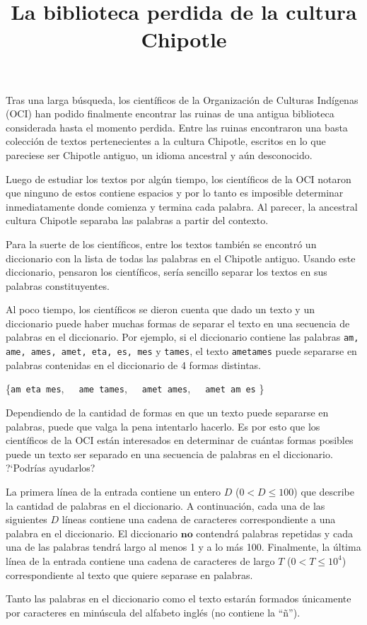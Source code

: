 \documentclass{oci}
\title{La biblioteca perdida de la cultura Chipotle}
\begin{document}
\begin{problemDescription}
Tras una larga búsqueda, los científicos de la Organización de Culturas
Indígenas (OCI) han podido finalmente encontrar las ruinas de una antigua
biblioteca considerada hasta el momento perdida.
Entre las ruinas encontraron una basta colección de textos pertenecientes a la
cultura Chipotle, escritos en lo que pareciese ser Chipotle antiguo, un idioma
ancestral y aún desconocido.

Luego de estudiar los textos por algún tiempo, los científicos de la OCI notaron
que ninguno de estos contiene espacios y por lo tanto es imposible determinar
inmediatamente donde comienza y termina cada palabra.
Al parecer, la ancestral cultura Chipotle separaba las palabras a partir del
contexto.

Para la suerte de los científicos, entre los textos también se encontró un
diccionario con la lista de todas las palabras en el Chipotle antiguo.
Usando este diccionario, pensaron los científicos, sería sencillo separar los
textos en sus palabras constituyentes.

Al poco tiempo, los científicos se dieron cuenta que dado un texto y un
diccionario puede haber muchas formas de separar el texto en una secuencia de
palabras en el diccionario.
Por ejemplo, si el diccionario contiene las palabras \texttt{am, ame, ames,
  amet, eta, es, mes} y \texttt{tames}, el texto \texttt{ametames}
puede separarse en palabras contenidas en el diccionario de 4 formas distintas.

\begin{center}
\{\texttt{am eta mes},\ \ \  \texttt{ame tames},\ \ \  \texttt{amet ames},\ \ \  \texttt{amet am es}  \}
\end{center}


Dependiendo de la cantidad de formas en que un texto puede separarse en
palabras, puede que valga la pena intentarlo hacerlo.
Es por esto que los científicos de la OCI están interesados en determinar de
cuántas formas posibles puede un texto ser separado en una secuencia de palabras
en el diccionario.
?`Podrías ayudarlos?
\end{problemDescription}

\begin{inputDescription}
  La primera línea de la entrada contiene un entero $D$ ($0 < D \leq 100$) que
  describe la cantidad de palabras en el diccionario.
  A continuación, cada una de las siguientes $D$ líneas contiene una cadena de
  caracteres correspondiente a una palabra en el diccionario.
  El diccionario $\textbf{no}$ contendrá palabras repetidas y cada una de las
  palabras tendrá largo al menos 1 y a lo más 100.
  Finalmente, la última línea de la entrada contiene una cadena de caracteres de
  largo $T$ ($0 < T \leq 10^4$) correspondiente al texto que quiere separase en
  palabras.

  Tanto las palabras en el diccionario como el texto estarán formados
  únicamente por caracteres en minúscula del alfabeto inglés (no contiene la
  ``ñ'').
\end{inputDescription}
\end{document}
